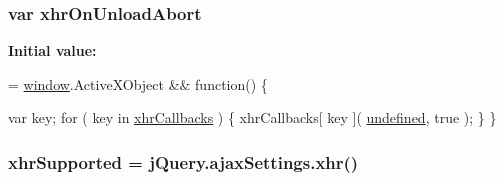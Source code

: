 \subsubsection[{xhr\+On\+Unload\+Abort}]{\setlength{\rightskip}{0pt plus 5cm}var xhr\+On\+Unload\+Abort}\label{packages_2j_query_81_810_82_2_content_2_scripts_2jquery-1_810_82_8js_a271c099ab18ab35c15cac2faa2a097aa}
{\bfseries Initial value\+:}
\begin{DoxyCode}
= \hyperlink{_bibabook_2_scripts_2jquery-1_810_82_8js_a04a8a2bbfa9c15500892b8e5033d625b}{window}.ActiveXObject && \textcolor{keyword}{function}() \{
        
        var key;
        \textcolor{keywordflow}{for} ( key in \hyperlink{_bibabook_2_scripts_2jquery-1_810_82_8js_a068f27a70831ff3a9e0ffa79e063847f}{xhrCallbacks} ) \{
            xhrCallbacks[ key ]( \hyperlink{_bibabook_2_scripts_2jquery-1_810_82_8js_a08113a236cc18d2a9d5ce27e638012be}{undefined}, true );
        \}
    \}
\end{DoxyCode}
\hypertarget{packages_2j_query_81_810_82_2_content_2_scripts_2jquery-1_810_82_8js_afd7e72f2f357a5a8b17e46776a6283eb}{}
\subsubsection[{xhr\+Supported}]{\setlength{\rightskip}{0pt plus 5cm}xhr\+Supported = {\bf j\+Query.\+ajax\+Settings.\+xhr}()}\label{packages_2j_query_81_810_82_2_content_2_scripts_2jquery-1_810_82_8js_afd7e72f2f357a5a8b17e46776a6283eb}
